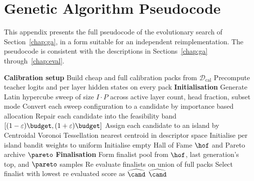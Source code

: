 \section{Genetic Algorithm Pseudocode}
\label{app:ga_pseudocode}

This appendix presents the full pseudocode of the evolutionary search of Section~\ref{chap:ga}, in a form suitable for an independent reimplementation. The pseudocode is consistent with the descriptions in Sections~\ref{chap:ga} through~\ref{chap:eval}.

\begin{algorithm}[h]
\SetAlgoLined
\DontPrintSemicolon
{}
\BlankLine
\textbf{Calibration setup} \;
Build cheap and full calibration packs from $\mathcal{D}_{\mathrm{cal}}$ \;
Precompute teacher logits and per layer hidden states on every pack \;
\BlankLine
\textbf{Initialisation} \;
Generate Latin hypercube sweep of size $I \cdot P$ across active layer count, head fraction, subset mode \;
Convert each sweep configuration to a candidate by importance based allocation \;
Repair each candidate into the feasibility band $[(1 - \varepsilon) \budget, (1 + \varepsilon) \budget]$ \;
Assign each candidate to an island by Centroidal Voronoi Tessellation nearest centroid in descriptor space \;
Initialise per island bandit weights to uniform \;
Initialise empty Hall of Fame $\hof$ and Pareto archive $\pareto$ \;
\BlankLine
{}
\BlankLine
\textbf{Finalisation} \;
Form finalist pool from $\hof$, last generation's top, and $\pareto$ samples \;
Re evaluate finalists on union of full packs \;
Select finalist with lowest re evaluated score as $\widehat{\cand}$ \;
\BlankLine
\Return $\widehat{\cand}$ \;
\caption{Evolutionary architecture search with cohort gated selection.}
\end{algorithm}
